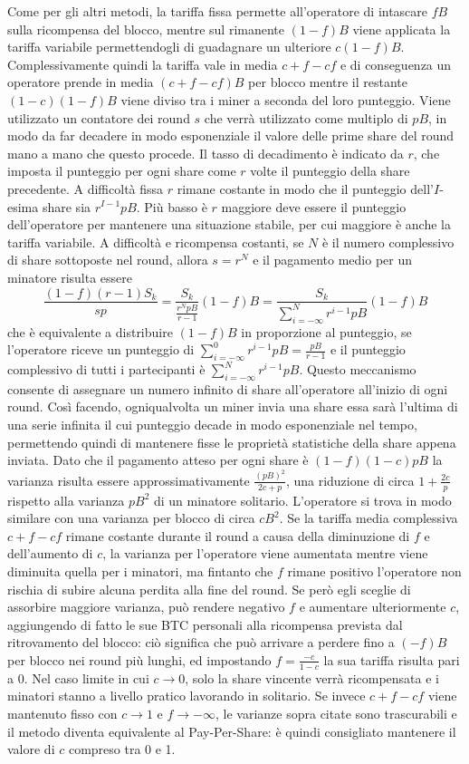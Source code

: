 Come per gli altri metodi, la tariffa fissa permette all'operatore di intascare $fB$ sulla ricompensa del blocco, mentre sul rimanente $(1-f)B$ viene applicata la tariffa variabile permettendogli di guadagnare un ulteriore $c(1-f)B$. Complessivamente quindi la tariffa vale in media $c + f -cf$ e di conseguenza un operatore prende in media $(c+f-cf)B$  per blocco mentre il restante $(1-c)(1-f)B$ viene diviso tra i miner a seconda del loro punteggio.
Viene utilizzato un contatore dei round $s$ che verrà utilizzato come multiplo di $pB$, in modo da far decadere in modo esponenziale il valore delle prime share del round mano a mano che questo procede.
Il tasso di decadimento è indicato da $r$, che imposta il punteggio per ogni share come $r$ volte il punteggio della share precedente. A difficoltà fissa $r$ rimane costante in modo che il punteggio dell'$I$-esima share sia $r^{I-1}pB$. Più basso è $r$ maggiore deve essere il punteggio dell'operatore per mantenere una situazione stabile, per cui maggiore è anche la tariffa variabile.
A difficoltà e ricompensa costanti, se $N$ è il numero complessivo di share sottoposte nel round, allora $s=r^N$ e il pagamento medio per un minatore risulta essere
\[ \frac{(1-f)(r-1)S_k}{sp} = \frac{S_k}{\frac{r^N pB}{r-1}}(1-f)B = \frac{S_k}{\sum^N_{i=-\infty}r^{i-1}pB}(1-f)B \]
che è equivalente a distribuire $(1-f)B$ in proporzione al punteggio, se l'operatore riceve un punteggio di $\sum^0_{i=-\infty}r^{i-1}pB = \frac{pB}{r-1}$ e il punteggio complessivo di tutti i partecipanti è $\sum^N_{i=-\infty}r^{i-1}pB$.
Questo meccanismo consente di assegnare un numero infinito di share all'operatore all'inizio di ogni round. Così facendo, ogniqualvolta un miner invia una share essa sarà l'ultima di una serie infinita il cui punteggio decade in modo esponenziale nel tempo, permettendo quindi di mantenere fisse le proprietà statistiche della share appena inviata.
Dato che il pagamento atteso per ogni share è $(1-f)(1-c)pB$ la varianza risulta essere approssimativamente $\frac{(pB)^2}{2c+p}$, una riduzione di circa $1+\frac{2c}{p}$ rispetto alla varianza $pB^2$ di un minatore solitario. L'operatore si trova in modo similare con una varianza per blocco di circa $cB^2$.
Se la tariffa media complessiva $c+f-cf$ rimane costante durante il round a causa della diminuzione di $f$ e dell'aumento di $c$, la varianza per l'operatore viene aumentata mentre viene diminuita quella per i minatori, ma fintanto che $f$ rimane positivo l'operatore non rischia di subire alcuna perdita alla fine del round. Se però egli sceglie di assorbire maggiore varianza, può rendere negativo $f$ e aumentare ulteriormente $c$, aggiungendo di fatto le sue BTC personali alla ricompensa prevista dal ritrovamento del blocco: ciò significa che può arrivare a perdere fino a $(-f)B$ per blocco nei round più lunghi, ed impostando $f=\frac{-c}{1-c}$ la sua tariffa risulta pari a 0.
Nel caso limite in cui $c \rightarrow 0$, solo la share vincente verrà ricompensata e i minatori stanno a livello pratico lavorando in solitario.
Se invece $c+f-cf$ viene mantenuto fisso con $c \rightarrow 1$ e $f \rightarrow -\infty$, le varianze sopra citate sono trascurabili e il metodo diventa equivalente al Pay-Per-Share: è quindi consigliato mantenere il valore di $c$ compreso tra 0 e 1.

